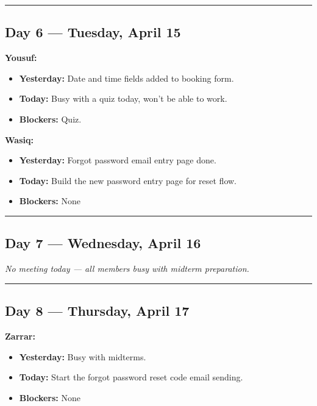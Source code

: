 \documentclass[12pt,a4paper]{article}
\begin{document}
\vspace{1em}\hrule\vspace{1em}

\subsection*{Day 6 --- Tuesday, April 15}

\textbf{Yousuf:}
\begin{itemize}[noitemsep]
    \item \textbf{Yesterday:} Date and time fields added to booking form.
    \item \textbf{Today:} Busy with a quiz today, won't be able to work.
    \item \textbf{Blockers:} Quiz.
\end{itemize}

\textbf{Wasiq:}
\begin{itemize}[noitemsep]
    \item \textbf{Yesterday:} Forgot password email entry page done.
    \item \textbf{Today:} Build the new password entry page for reset flow.
    \item \textbf{Blockers:} None
\end{itemize}

\vspace{1em}\hrule\vspace{1em}

\subsection*{Day 7 --- Wednesday, April 16}

\textit{No meeting today --- all members busy with midterm preparation.}

\vspace{1em}\hrule\vspace{1em}

\subsection*{Day 8 --- Thursday, April 17}

\textbf{Zarrar:}
\begin{itemize}[noitemsep]
    \item \textbf{Yesterday:} Busy with midterms.
    \item \textbf{Today:} Start the forgot password reset code email sending.
    \item \textbf{Blockers:} None
\end{itemize}
\end{document}
